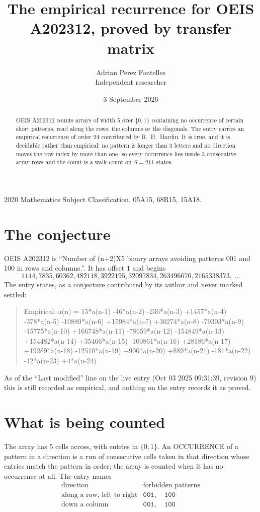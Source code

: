 \documentclass[11pt,a4paper]{article}
\title{The empirical recurrence for OEIS A202312, proved by transfer matrix}
\author{Adrian Perez Fontelles\\ \small Independent researcher}
\date{3 September 2026}
\theoremstyle{plain}
\theoremstyle{definition}
\begin{document}
\maketitle

\begin{abstract}
OEIS A202312 counts arrays of width $5$ over $\{0,1\}$ containing no occurrence of certain short
patterns, read along the rows, the columns or the diagonals. The entry carries an empirical
recurrence of order $24$ contributed by R.~H.~Hardin. It is true, and it is decidable
rather than empirical: no pattern is longer than $3$ letters and no direction moves the row
index by more than one, so every occurrence lies inside $3$ consecutive array rows and the
count is a walk count on $S=211$ states.
\end{abstract}

\noindent\small 2020 Mathematics Subject Classification. 05A15, 68R15, 15A18.\normalsize

\section{The conjecture}

OEIS A202312 is ``Number of (n+2)X5 binary arrays avoiding patterns 001 and 100 in rows and columns.''. It has offset $1$ and begins
\[
1144, 7835, 60362, 482118, 3922195, 32097834, 263496670, 2165338373,\ \dots
\]
The entry states, as a conjecture contributed by its author and never marked settled:
\begin{quote}
Empirical: a(n) = 15*a(n-1) -46*a(n-2) -236*a(n-3) +1457*a(n-4) -378*a(n-5) -10889*a(n-6) +15984*a(n-7) +30274*a(n-8) -79303*a(n-9) -15775*a(n-10) +166748*a(n-11) -78659*a(n-12) -154849*a(n-13) +154482*a(n-14) +35466*a(n-15) -100861*a(n-16) +28186*a(n-17) +19289*a(n-18) -12510*a(n-19) +906*a(n-20) +889*a(n-21) -181*a(n-22) -12*a(n-23) +4*a(n-24)
\end{quote}
As of the ``Last modified'' line on the live entry (Oct 03 2025 09:31:39, revision 9) this is still
recorded as empirical, and nothing on the entry records it as proved.

\section{What is being counted}

The array has $5$ cells across, with entries in $\{0,1\}$. An OCCURRENCE of a pattern in a
direction is a run of consecutive cells taken in that direction whose entries match the pattern
in order; the array is counted when it has no occurrence at all. The entry names
\[
\begin{array}{ll}
\text{direction} & \text{forbidden patterns} \\[2pt]
\text{along a row, left to right} & \mathtt{001},\quad \mathtt{100} \\
\text{down a column} & \mathtt{001},\quad \mathtt{100} \\
\end{array}
\]
\end{document}
